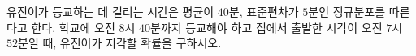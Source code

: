 유진이가 등교하는 데 걸리는 시간은 평균이 $40$분, 표준편차가 $5$분인 정규분포를 따른다고 한다. 학교에 오전 $8$시 $40$분까지 등교해야 하고 집에서 출발한 시각이 오전 $7$시 $52$분일 때, 유진이가 지각할 확률을 구하시오. 
